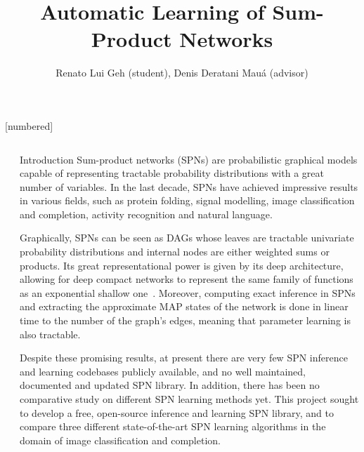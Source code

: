 \documentclass[final,hyperref={pdfpagelabels=false},notheorems]{beamer}
\title{\Huge Automatic Learning of Sum-Product Networks}
\author{\Large Renato Lui Geh (student), Denis Deratani Mauá (advisor)}
\institute{\Large Institute of Mathematics and Statistics, University of São Paulo\\\vspace{4mm}
\texttt{\Large \{renatolg,ddm\}@ime.usp.br}}
\newcommand{\shrink}{-15pt}
\theoremstyle{thesisstyle}
\newcommand{\pskip}{\vskip 0.5cm}
\begin{document}
[numbered]

\begin{frame}[t]

\begin{columns}[t]
  \begin{column}{.02\textwidth}\end{column} %


  \begin{column}{.505\textwidth}

    \vspace{\shrink}
    \begin{block}{Introduction}
      Sum-product networks (SPNs) are probabilistic graphical models capable of representing
      tractable probability distributions with a great number of variables. In the last decade,
      SPNs have achieved impressive results in various fields, such as protein folding, signal
      modelling, image classification and completion, activity recognition and natural
      language.\pskip

      Graphically, SPNs can be seen as DAGs whose leaves are tractable univariate probability
      distributions and internal nodes are either weighted sums or products. Its great
      representational power is given by its deep architecture, allowing for deep compact networks
      to represent the same family of functions as an exponential shallow
      one~\cite{shallow-vs-deep}. Moreover, computing exact inference in SPNs and extracting the
      approximate MAP states of the network is done in linear time to the number of the graph's
      edges, meaning that parameter learning is also tractable.\pskip

      Despite these promising results, at present there are very few SPN inference and learning
      codebases publicly available, and no well maintained, documented and updated SPN library. In
      addition, there has been no comparative study on different SPN learning methods yet. This
      project sought to develop a free, open-source inference and learning SPN library, and to
      compare three different state-of-the-art SPN learning algorithms in the domain of image
      classification and completion.
    \end{block}


\end{column}
\end{columns}
\end{frame}
\end{document}
